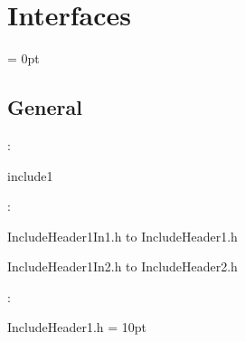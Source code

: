 
\section{Interfaces} 


\parskip = 0pt

\vspace{3mm} \subsection*{General}

: 

include1
\vspace{2mm}

\vspace{5mm}

: 



IncludeHeader1In1.h to IncludeHeader1.h

IncludeHeader1In2.h to IncludeHeader2.h
\vspace{2mm}

: 

IncludeHeader1.h
\vspace{2mm}\parskip = 10pt 
